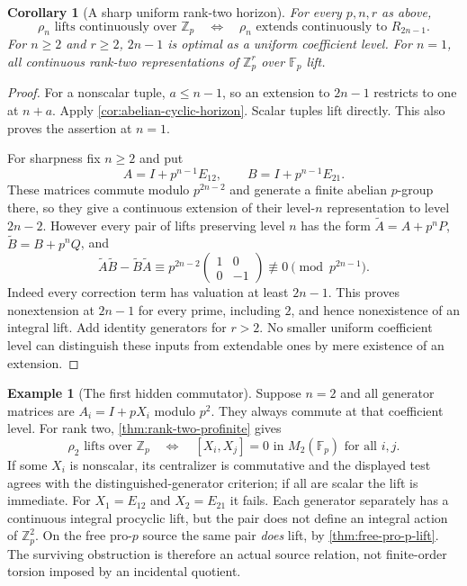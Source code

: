 \documentclass[11pt]{article}
\newtheorem{corollary}[theorem]{Corollary}
\theoremstyle{definition}
\newtheorem{example}[theorem]{Example}
\theoremstyle{remark}
\begin{document}
\begin{corollary}[A sharp uniform rank-two horizon]\label{cor:rank-two-sharp-horizon}
For every $p,n,r$ as above,
\[
 \boxed{\rho_n\text{ lifts continuously over }\mathbb Z_p
 \quad\Longleftrightarrow\quad
 \rho_n\text{ extends continuously to }R_{2n-1}.}
\]
For $n\geq2$ and $r\geq2$, $2n-1$ is optimal as a uniform coefficient level. For $n=1$, all continuous rank-two representations of $\mathbb Z_p^r$ over $\mathbb F_p$ lift.
\end{corollary}
\begin{proof}
For a nonscalar tuple, $a\leq n-1$, so an extension to $2n-1$ restricts to one at $n+a$. Apply \cref{cor:abelian-cyclic-horizon}. Scalar tuples lift directly. This also proves the assertion at $n=1$.

For sharpness fix $n\geq2$ and put
\[
 A=I+p^{n-1}E_{12},\qquad B=I+p^{n-1}E_{21}.
\]
These matrices commute modulo $p^{2n-2}$ and generate a finite abelian $p$-group there, so they give a continuous extension of their level-$n$ representation to level $2n-2$. However every pair of lifts preserving level $n$ has the form
$\widetilde A=A+p^nP$, $\widetilde B=B+p^nQ$, and
\[
 \widetilde A\widetilde B-\widetilde B\widetilde A
 \equiv p^{2n-2}
 \begin{pmatrix}1&0\\0&-1\end{pmatrix}
 \not\equiv0\pmod{p^{2n-1}}.
\]
Indeed every correction term has valuation at least $2n-1$. This proves nonextension at $2n-1$ for every prime, including $2$, and hence nonexistence of an integral lift. Add identity generators for $r>2$. No smaller uniform coefficient level can distinguish these inputs from extendable ones by mere existence of an extension.
\end{proof}

\begin{example}[The first hidden commutator]\label{ex:abelian-tangent}
Suppose $n=2$ and all generator matrices are $A_i=I+pX_i$ modulo $p^2$. They always commute at that coefficient level. For rank two, \cref{thm:rank-two-profinite} gives
\[
 \rho_2\text{ lifts over }\mathbb Z_p
 \quad\Longleftrightarrow\quad
 [X_i,X_j]=0\text{ in }M_2(\mathbb F_p)\text{ for all }i,j.
\]
If some $X_i$ is nonscalar, its centralizer is commutative and the displayed test agrees with the distinguished-generator criterion; if all are scalar the lift is immediate. For $X_1=E_{12}$ and $X_2=E_{21}$ it fails. Each generator separately has a continuous integral procyclic lift, but the pair does not define an integral action of $\mathbb Z_p^2$. On the free pro-$p$ source the same pair \emph{does} lift, by \cref{thm:free-pro-p-lift}. The surviving obstruction is therefore an actual source relation, not finite-order torsion imposed by an incidental quotient.
\end{example}
\end{document}
